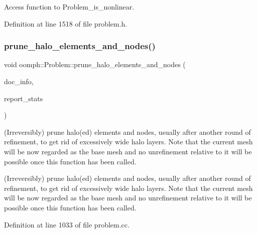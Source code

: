 Access function to Problem\+\_\+is\+\_\+nonlinear. 



Definition at line 1518 of file problem.\+h.

\mbox{\label{classoomph_1_1Problem_a8c5982a9323392e31a166e23a0c7f0a3}} 
\subsubsection{\texorpdfstring{prune\+\_\+halo\+\_\+elements\+\_\+and\+\_\+nodes()}{prune\_halo\_elements\_and\_nodes()}\hspace{0.1cm}{\footnotesize\ttfamily [1/2]}}
{\footnotesize\ttfamily void oomph\+::\+Problem\+::prune\+\_\+halo\+\_\+elements\+\_\+and\+\_\+nodes (\begin{DoxyParamCaption}\item[{\hyperlink{classoomph_1_1DocInfo}{Doc\+Info} \&}]{doc\+\_\+info,  }\item[{const bool \&}]{report\+\_\+stats }\end{DoxyParamCaption})}



(Irreversibly) prune halo(ed) elements and nodes, usually after another round of refinement, to get rid of excessively wide halo layers. Note that the current mesh will be now regarded as the base mesh and no unrefinement relative to it will be possible once this function has been called. 

(Irreversibly) prune halo(ed) elements and nodes, usually after another round of refinement, to get rid of excessively wide halo layers. Note that the current mesh will be now regarded as the base mesh and no unrefinement relative to it will be possible once this function has been called. 

Definition at line 1033 of file problem.\+cc.



